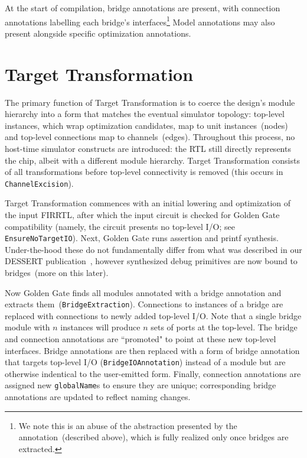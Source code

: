 At the start of compilation, bridge annotations are present, with connection
annotations labelling each bridge's interfaces\footnote{We note this is an abuse of the
abstraction presented by the annotation~(described above), which is fully realized only once bridges are extracted.}
Model annotations may also present alongside specific optimization annotations.

\section{Target Transformation}

The primary function of Target Transformation is to coerce the design's module
hierarchy into a form that matches the eventual simulator topology: top-level
instances, which wrap optimization candidates, map to unit instances~(nodes) and top-level connections map to
channels~(edges). Throughout this process, no host-time simulator constructs
are introduced: the RTL still directly represents the chip, albeit with a different module hierarchy.  Target Transformation
consists of all transformations before top-level connectivity is removed
(this occurs in \texttt{ChannelExcision}).

Target Transformation commences with an initial lowering and optimization of the input FIRRTL, after which
the input circuit is checked for Golden Gate compatibility (namely, the circuit
presents no top-level I/O; see \texttt{EnsureNoTargetIO}). Next, Golden Gate
runs assertion and printf synthesis. Under-the-hood these do not fundamentally differ
from what was described in our DESSERT publication~\cite{DESSERT}, however
synthesized debug primitives are now bound to bridges~(more on this later).

Now Golden Gate finds all modules annotated with a bridge annotation and extracts
them~(\texttt{BridgeExtraction}). Connections to instances of
a bridge are replaced with connections to newly added
top-level I/O. Note that a single bridge module with $n$ instances will produce $n$
sets of ports at the top-level. The bridge and connection annotations are
``promoted" to point at these new top-level interfaces. Bridge annotations are then
replaced with a form of bridge annotation that targets top-level I/O
(\texttt{BridgeIOAnnotation}) instead of a module but are otherwise indentical to the user-emitted form.
Finally, connection annotations are assigned new \texttt{globalName}s to ensure they
are unique; corresponding bridge annotations are updated to reflect naming changes.

